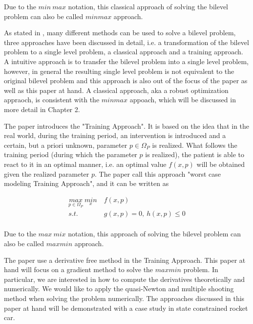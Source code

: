 \documentclass  [
  paper    = a4,
  BCOR     = 10mm,
  twoside,
  fontsize = 12pt,
  fleqn,
  toc      = bibnumbered,
  toc      = listofnumbered,
  numbers  = noendperiod,
  headings = normal,
  listof   = leveldown,
  version  = 3.03
]                                       {scrreprt}
\newcommand{\<}{\langle}
\renewcommand{\>}{\rangle}
\begin{document}
   
   Due to the $min \ max$ notation, this classical approach of solving the bilevel problem can also be called $min max$ approach. 
   
   As stated in \cite{MatSch22}, many different methods can be used to solve a bilevel problem, three approaches have been discussed in detail, i.e. a transformation of the bilevel problem to a single level problem, a classical approach and a training approach. A intuitive approach is to transfer the bilevel problem into a single level problem, however, in general the resulting single level problem is not equivalent to the original bilevel problem and this approach is also out of the focus of the paper \cite{MatSch22} as well as this paper at hand. A classical approach, aka a robust optimization appraoch, is consistent with the $minmax$ appoach, which will be discussed in more detail in Chapter 2.
   
   The paper \cite{MatSch22} introduces the "Training Approach".  It is based on the idea that in the real world, during the training period, an intervention is introduced and a certain, but a priori unknown, parameter $p \in \Omega_P$ is realized. What follows the training period (during which the parameter $p$ is realized), the patient is able to react to it in an optimal manner, i.e. an optimal value $f(x,p)$ will be obtained given the  realized parameter $p$. The paper \cite{MatSch22} call this approach "worst case modeling Training Approach", and it can be written as 
   
   \begin{equation}
   \begin{aligned}
   \underset{p \in \Omega_P}{max} \ \underset{x}{min} & \  f(x,p) \\ 
   s.t.  & \  g(x, p) = 0, \  h(x,p)  \leq  0 \\
   \end{aligned}
   \label{maxmin}
   \end{equation}
   
   Due to the $max \ mix$ notation, this approach of solving the bilevel problem can also be called $max min$ approach. 
   
   The paper \cite{MatSch22} use a derivative free method in the Training Approach. This paper at hand will focus on a gradient method to solve the $maxmin$ problem.  In particular, we are interested in how to compute the derivatives theoretically and numerically.  We would like to apply the quasi-Newton and multiple shooting method when solving the problem numerically. The approaches discussed in this paper at hand will be demonstrated with a case study in state constrained rocket car. 
   
\end{document}
